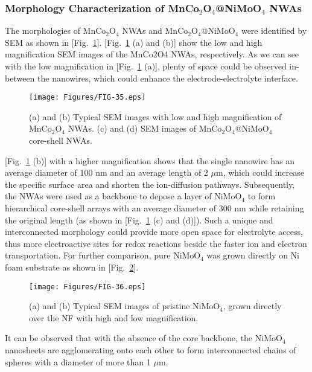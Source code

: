 \documentclass[reprint,amsmath,amssymb,aps,floatfix,
]{revtex4-2}
\begin{document}
\subsubsection{Morphology Characterization of MnCo$_2$O$_4$@NiMoO$_4$ NWAs}
The morphologies of MnCo$_2$O$_4$ NWAs and MnCo$_2$O$_4$@NiMoO$_4$ were identified by SEM as shown in [Fig.~\ref{fig:fig35}]. [Fig.~\ref{fig:fig35} (a) and (b)] show the low and high magnification SEM images of the MnCo2O4 NWAs, respectively. As we can see with the low magnification in [Fig.~\ref{fig:fig35} (a)], plenty of space could be observed in-between the nanowires, which could enhance the electrode-electrolyte interface.
\begin{figure}[t]
    \centering
    \texttt{[image: Figures/FIG-35.eps]}
    \caption{\label{fig:fig35}(a) and (b) Typical SEM images with low and high magnification of MnCo$_2$O$_4$ NWAs. (c) and (d) SEM images of MnCo$_2$O$_4$@NiMoO$_4$ core-shell NWAs.}
    \end{figure}
[Fig.~\ref{fig:fig35} (b)] with a higher magnification shows that the single nanowire has an average diameter of 100 nm and an average length of 2 $\mu$m, which could increase the specific surface area and shorten the ion-diffusion pathways. Subsequently, the NWAs were used as a backbone to depose a layer of NiMoO$_4$ to form hierarchical core-shell arrays with an average diameter of 300 nm while retaining the original length (as shown in [Fig.~\ref{fig:fig35} (c) and (d)]). Such a unique and interconnected morphology could provide more open space for electrolyte access, thus more electroactive sites for redox reactions beside the faster ion and electron transportation. For further comparison, pure NiMoO$_4$ was grown directly on Ni foam substrate as shown in [Fig.~\ref{fig:fig36}].
\begin{figure}[t]
    \centering
    \texttt{[image: Figures/FIG-36.eps]}
    \caption{\label{fig:fig36}(a) and (b) Typical SEM images of pristine NiMoO$_4$, grown directly over the NF with high and low magnification.}
    \end{figure}
It can be observed that with the absence of the core backbone, the NiMoO$_4$ nanosheets are agglomerating onto each other to form interconnected chains of spheres with a diameter of more than 1 $\mu$m.
\end{document}
